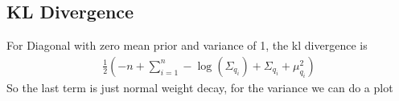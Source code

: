 \documentclass[a4paper]{scrartcl}
\begin{document}
    
    



    \subsection{KL Divergence}
    For Diagonal with zero mean prior and variance of 1, the kl divergence is
    \begin{align}
      \frac{1}{2}  (- n + \sum_{i=1}^n - \log(\Sigma_{q_i}) + \Sigma_{q_i} +  \mu_{q_i}^2)
    \end{align}
    So the last term is just normal weight decay, for the variance we can do a plot\\
\end{document}

